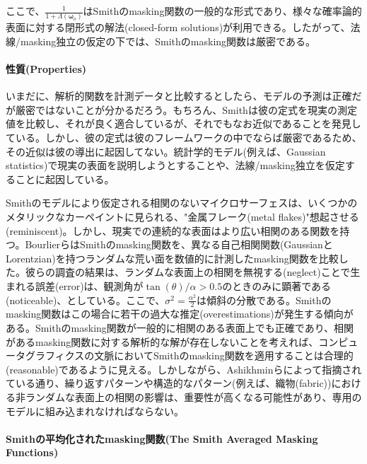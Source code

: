 \documentclass[a4j,xelatex,ja=standard]{bxjsarticle}
\begin{document}
ここで、$\frac{1}{1 + \Lambda(\boldsymbol{\omega}_o)}$はSmithのmasking関数の一般的な形式であり、様々な確率論的表面に対する閉形式の解法(closed-form solutions)が利用できる。したがって、法線/masking独立の仮定の下では、Smithのmasking関数は厳密である。

\paragraph{性質(Properties)}

いまだに、解析的関数を計測データと比較するとしたら、モデルの予測は正確だが厳密ではないことが分かるだろう。もちろん、Smithは彼の定式を現実の測定値を比較し、それが良く適合しているが、それでもなお近似であることを発見している。しかし、彼の定式は彼のフレームワークの中でならば厳密であるため、その近似は彼の導出に起因してない。統計学的モデル(例えば、Gaussian statistics)で現実の表面を説明しようとすることや、法線/masking独立を仮定することに起因している。

Smithのモデルにより仮定される相関のないマイクロサーフェスは、いくつかのメタリックなカーペイントに見られる、"金属フレーク(metal flakes)"想起させる(reminiscent)。しかし、現実での連続的な表面はより広い相関のある関数を持つ。BourlierらはSmithのmasking関数を、異なる自己相関関数(GaussianとLorentzian)を持つランダムな荒い面を数値的に計測したmasking関数を比較した。彼らの調査の結果は、ランダムな表面上の相関を無視する(neglect)ことで生まれる誤差(error)は、観測角が$\tan(\theta) / \alpha > 0.5$のときのみに顕著である(noticeable)、としている。ここで、$\sigma^2 = \frac{\alpha^2}{2}$は傾斜の分散である。Smithのmasking関数はこの場合に若干の過大な推定(overestimations)が発生する傾向がある。Smithのmasking関数が一般的に相関のある表面上でも正確であり、相関があるmasking関数に対する解析的な解が存在しないことを考えれば、コンピュータグラフィクスの文脈においてSmithのmasking関数を適用することは合理的(reasonable)であるように見える。しかしながら、Ashikhminらによって指摘されている通り、繰り返すパターンや構造的なパターン(例えば、織物(fabric))における非ランダムな表面上の相関の影響は、重要性が高くなる可能性があり、専用のモデルに組み込まれなければならない。

\paragraph{Smithの平均化されたmasking関数(The Smith Averaged Masking Functions)}
\end{document}
